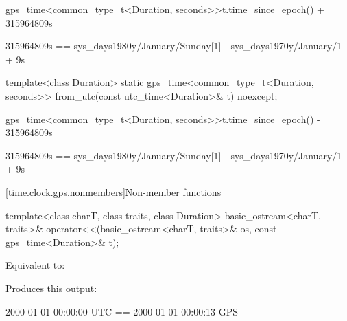 \begin{itemdescr}
\pnum
\returns
\begin{codeblock}
gps_time<common_type_t<Duration, seconds>>{t.time_since_epoch()} + 315964809s
\end{codeblock}
\begin{note}
\begin{codeblock}
315964809s == sys_days{1980y/January/Sunday[1]} - sys_days{1970y/January/1} + 9s
\end{codeblock}
\end{note}
\end{itemdescr}

%
\begin{itemdecl}
template<class Duration>
  static gps_time<common_type_t<Duration, seconds>>
    from_utc(const utc_time<Duration>& t) noexcept;
\end{itemdecl}

\begin{itemdescr}
\pnum
\returns
\begin{codeblock}
gps_time<common_type_t<Duration, seconds>>{t.time_since_epoch()} - 315964809s
\end{codeblock}
\begin{note}
\begin{codeblock}
315964809s == sys_days{1980y/January/Sunday[1]} - sys_days{1970y/January/1} + 9s
\end{codeblock}
\end{note}
\end{itemdescr}

[time.clock.gps.nonmembers]{Non-member functions}

%
\begin{itemdecl}
template<class charT, class traits, class Duration>
  basic_ostream<charT, traits>&
    operator<<(basic_ostream<charT, traits>& os, const gps_time<Duration>& t);
\end{itemdecl}

\begin{itemdescr}
\pnum
\effects
Equivalent to:

\pnum
\begin{example}

Produces this output:

\begin{outputblock}
2000-01-01 00:00:00 UTC == 2000-01-01 00:00:13 GPS
\end{outputblock}
\end{example}
\end{itemdescr}

